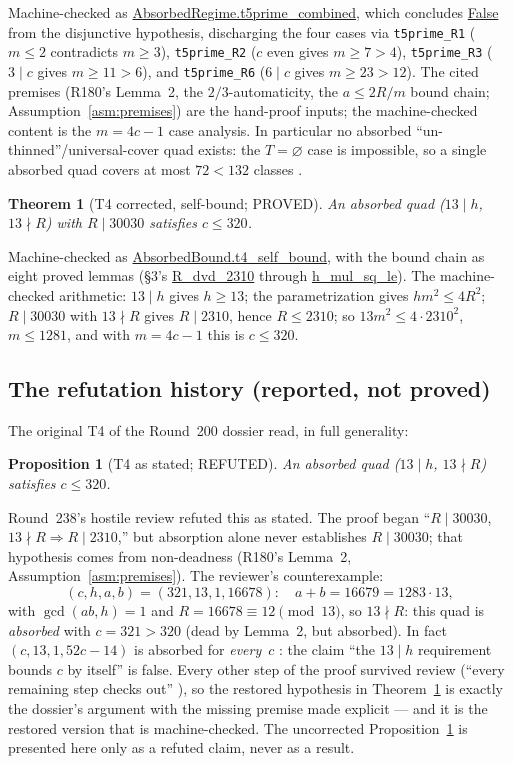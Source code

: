 \documentclass[11pt,a4paper]{article}
\newtheorem{theorem}{Theorem}
\newtheorem{proposition}{Proposition}
\theoremstyle{definition}
\begin{document}
Machine-checked as \url{AbsorbedRegime.t5prime_combined}, which
concludes \url{False} from the disjunctive hypothesis, discharging
the four cases via \texttt{t5prime\_R1} ($m\le2$ contradicts $m\ge3$),
\texttt{t5prime\_R2} ($c$ even gives $m\ge7>4$),
\texttt{t5prime\_R3} ($3\mid c$ gives $m\ge11>6$), and
\texttt{t5prime\_R6} ($6\mid c$ gives $m\ge23>12$). The cited premises
(R180's Lemma~2, the $2/3$-automaticity, the $a\le2R/m$ bound chain;
Assumption~\ref{asm:premises}) are the hand-proof inputs; the
machine-checked content is the $m=4c-1$ case analysis. In particular
no absorbed ``un-thinned''/universal-cover quad exists: the
$T=\varnothing$ case is impossible, so a single absorbed quad covers
at most $72<132$ classes \cite{D200}.

\begin{theorem}[T4 corrected, self-bound; PROVED]
  \label{thm:t4corrected}
  An absorbed quad ($13\mid h$, $13\nmid R$) with $R\mid30030$
  satisfies $c\le320$.
\end{theorem}

Machine-checked as \url{AbsorbedBound.t4_self_bound}, with the
bound chain as eight proved lemmas (\S3's
\url{R_dvd_2310} through \url{h_mul_sq_le}). The
machine-checked arithmetic: $13\mid h$ gives $h\ge13$; the
parametrization gives $hm^2\le4R^2$; $R\mid30030$ with $13\nmid R$
gives $R\mid2310$, hence $R\le2310$; so $13m^2\le4\cdot2310^2$,
$m\le1281$, and with $m=4c-1$ this is $c\le320$.

\subsection{The refutation history (reported, not proved)}

The original T4 of the Round~200 dossier read, in full generality:

\begin{proposition}[T4 as stated; REFUTED]
  \label{prop:t4refuted}
  An absorbed quad ($13\mid h$, $13\nmid R$) satisfies $c\le320$.
\end{proposition}

Round~238's hostile review refuted this as stated. The proof began
``$R\mid30030$, $13\nmid R\Rightarrow R\mid2310$,'' but absorption
alone never establishes $R\mid30030$; that hypothesis comes from
non-deadness (R180's Lemma~2, Assumption~\ref{asm:premises}). The
reviewer's counterexample:
\begin{equation}
  \label{eq:counterexample}
  (c,h,a,b)=(321,13,1,16678):\quad a+b=16679=1283\cdot13,
\end{equation}
with $\gcd(ab,h)=1$ and $R=16678\equiv12\pmod{13}$, so $13\nmid R$:
this quad is \emph{absorbed} with $c=321>320$ (dead by Lemma~2, but
absorbed). In fact $(c,13,1,52c-14)$ is absorbed for \emph{every}~$c$
\cite{D238}: the claim ``the $13\mid h$ requirement bounds $c$ by
itself'' is false. Every other step of the proof survived
review (``every remaining step checks out'' \cite{D238}), so the
restored hypothesis in Theorem~\ref{thm:t4corrected} is exactly the
dossier's argument with the missing premise made explicit --- and it
is the restored version that is machine-checked. The uncorrected
Proposition~\ref{prop:t4refuted} is presented here only as a refuted
claim, never as a result.
\end{document}
